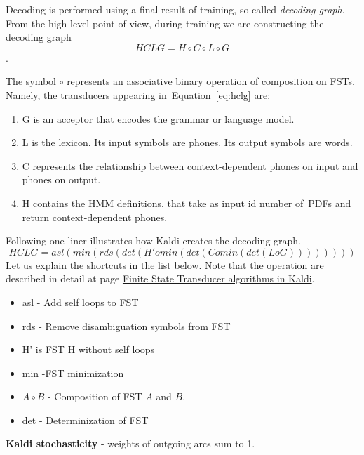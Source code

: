 Decoding is performed using a final result of training, so called {\it decoding graph}. 
From the high level point of view,
during training we are constructing the decoding graph 
\begin{equation} \label{eq:hclg}
HCLG = H\circ C\circ L\circ G
\end{equation}.

The symbol $\circ$ represents an associative binary operation of composition on \acp{FST}.
Namely, the transducers appearing in~Equation~\ref{eq:hclg} are:
\begin{enumerate}
    \item G is an acceptor that encodes the grammar or language model.
    \item L is the lexicon. Its input symbols are phones. Its output symbols are words.
    \item C represents the relationship between context-dependent phones on input and phones on output.
    \item H contains the \ac{HMM} definitions, that take as input id number of~\acp{PDF} and return context-dependent phones.
\end{enumerate}

Following one liner illustrates how Kaldi creates the decoding graph. 
\begin{equation}
   HCLG = asl(min(rds(det(H' o min(det(C o min(det(L o G)))))))) 
\end{equation}
Let us explain the shortcuts in the list below. Note that the operation are described in detail
at page \href{http://kaldi.sourceforge.net/fst_algo.html#fst_algo_stochastic} {Finite State Transducer algorithms in Kaldi}. 
\begin{itemize}
    \item asl - Add self loops to \ac{FST}
    \item rds - Remove disambiguation symbols from \ac{FST}
    \item H' is \ac{FST} H without self loops
    \item min -\ac{FST} minimization
    \item $A\circ B$  - Composition of \ac{FST} $A$ and $B$.
    \item det - Determinization of \ac{FST}
\end{itemize}

{\bf Kaldi stochasticity} - weights of outgoing arcs sum to 1.


